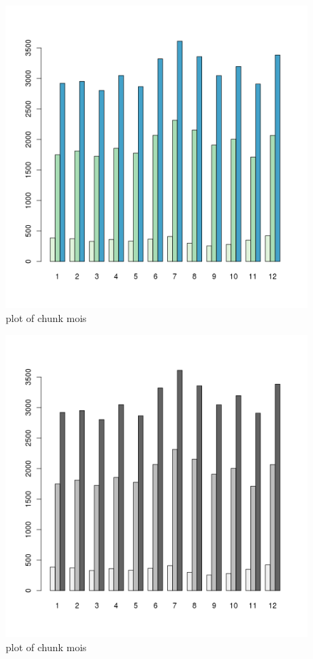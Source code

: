 \begin{figure}[htbp]
\centering
\includegraphics{figure/mois7.png}
\caption{plot of chunk mois}
\end{figure}

\begin{Shaded}
\begin{Highlighting}[]

  \NormalTok{(}\NormalTok{, }\NormalTok{))}
\end{Highlighting}
\end{Shaded}

\begin{figure}[htbp]
\centering
\includegraphics{figure/mois8.png}
\caption{plot of chunk mois}
\end{figure}

